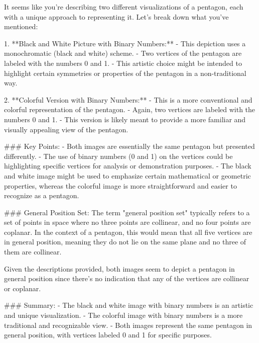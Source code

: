 It seems like you're describing two different visualizations of a pentagon, each with a unique approach to representing it. Let's break down what you've mentioned:

1. **Black and White Picture with Binary Numbers:**
   - This depiction uses a monochromatic (black and white) scheme.
   - Two vertices of the pentagon are labeled with the numbers 0 and 1.
   - This artistic choice might be intended to highlight certain symmetries or properties of the pentagon in a non-traditional way.

2. **Colorful Version with Binary Numbers:**
   - This is a more conventional and colorful representation of the pentagon.
   - Again, two vertices are labeled with the numbers 0 and 1.
   - This version is likely meant to provide a more familiar and visually appealing view of the pentagon.

### Key Points:
- Both images are essentially the same pentagon but presented differently.
- The use of binary numbers (0 and 1) on the vertices could be highlighting specific vertices for analysis or demonstration purposes.
- The black and white image might be used to emphasize certain mathematical or geometric properties, whereas the colorful image is more straightforward and easier to recognize as a pentagon.

### General Position Set:
The term "general position set" typically refers to a set of points in space where no three points are collinear, and no four points are coplanar. In the context of a pentagon, this would mean that all five vertices are in general position, meaning they do not lie on the same plane and no three of them are collinear.

Given the descriptions provided, both images seem to depict a pentagon in general position since there's no indication that any of the vertices are collinear or coplanar.

### Summary:
- The black and white image with binary numbers is an artistic and unique visualization.
- The colorful image with binary numbers is a more traditional and recognizable view.
- Both images represent the same pentagon in general position, with vertices labeled 0 and 1 for specific purposes.